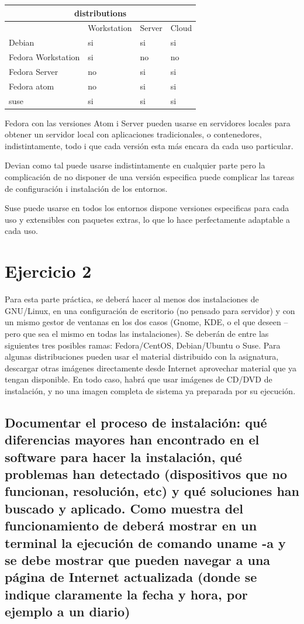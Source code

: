 \documentclass[preprint,11pt]{elsarticle}
\begin{document}
\begin{tabular}{ |p{4cm}||p{3cm}|p{3cm}|p{3cm}|  }
 \hline
 \multicolumn{4}{|c|}{distributions} \\
 \hline
  &Workstation  &Server  &Cloud \\
 \hline
Debian &si &si &si\\
Fedora Workstation  &si &no &no\\
Fedora Server &no &si &si\\
Fedora atom &no &si &si \\
suse &si &si &si \\
 \hline
\end{tabular}
\bigskip 

Fedora con las versiones Atom i Server pueden usarse en servidores locales para obtener un servidor local con aplicaciones tradicionales, o contenedores, indistintamente, todo i que cada versión esta más encara da cada uso particular.\bigskip

Devian como tal puede usarse indistintamente en cualquier parte pero la complicación de no disponer de una versión especifica puede complicar las tareas de configuración i instalación de los entornos.\bigskip

Suse puede usarse en todos los entornos dispone versiones especificas para cada uso y extensibles con paquetes extras, lo que lo hace perfectamente adaptable a cada uso.\bigskip

\clearpage
\section{Ejercicio 2}
Para esta parte práctica, se deberá hacer al menos dos instalaciones de GNU/Linux, en una configuración de escritorio (no pensado para servidor) y con un mismo gestor de ventanas en los dos casos (Gnome, KDE, o el que deseen – pero que sea el mismo en todas las instalaciones). Se deberán de entre las siguientes tres posibles ramas: Fedora/CentOS, Debian/Ubuntu o Suse. Para algunas distribuciones pueden usar el material distribuido con la asignatura, descargar otras imágenes directamente desde Internet aprovechar material que ya tengan disponible. En todo caso, habrá que usar imágenes de CD/DVD de instalación, y no una imagen completa de sistema ya preparada por su ejecución.\bigskip

\subsection{Documentar el proceso de instalación: qué diferencias mayores han encontrado en el software para hacer la instalación, qué problemas han detectado (dispositivos que no funcionan, resolución, etc) y qué soluciones han buscado y aplicado. Como muestra del funcionamiento de deberá mostrar en un terminal la ejecución de comando uname -a y se debe mostrar que pueden navegar a una página de Internet actualizada (donde se indique claramente la fecha y hora, por ejemplo a un diario) }
\end{document}
